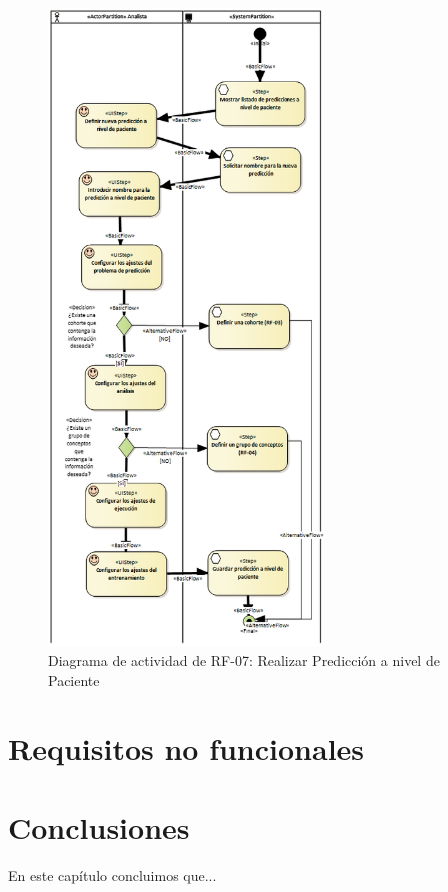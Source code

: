 \begin{figure}[H]
    \centering
    \includegraphics[width=0.65\textwidth]{figures/FR07.png}
    \caption{Diagrama de actividad de RF-07: Realizar Predicción a nivel de Paciente}
    \label{fig:FR07}
\end{figure}


\section{Requisitos no funcionales}


\section{Conclusiones}

En este capítulo concluimos que...
